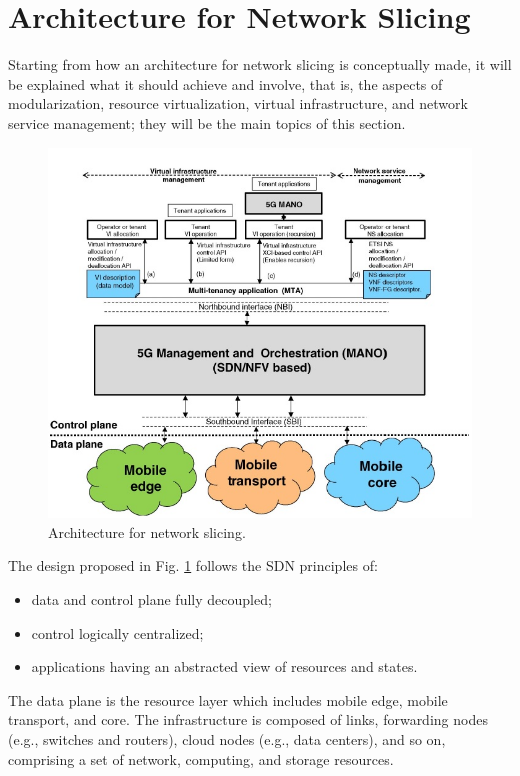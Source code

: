 \documentclass[a4paper,12pt]{report} %
\begin{document}
\newpage
\section{Architecture for Network Slicing} 
Starting from how an architecture for network slicing is conceptually made, it will be explained what it should achieve and involve, that is, the aspects of modularization, resource virtualization, virtual infrastructure, and network service management; they will be the main topics of this section.
\begin{figure}[h]
\centering
\includegraphics[scale=0.67]{pics/2.JPG}
\caption{Architecture for network slicing. \cite{al20185g}} 
\label{Arch}
\end{figure}
The design proposed in Fig. \ref{Arch} follows the SDN principles of:
\begin{itemize}
\item data and control plane fully decoupled;
\end{itemize}
\begin{itemize}
\item control logically centralized;
\end{itemize}
\begin{itemize}
\item applications having an abstracted view of resources and states.
\end{itemize}
The data plane is the resource layer which includes mobile edge, mobile transport, and core. The infrastructure is composed of links, forwarding nodes (e.g., switches and routers), cloud nodes (e.g., data centers), and so on, comprising a set of network, computing, and storage resources.\\
\end{document}
